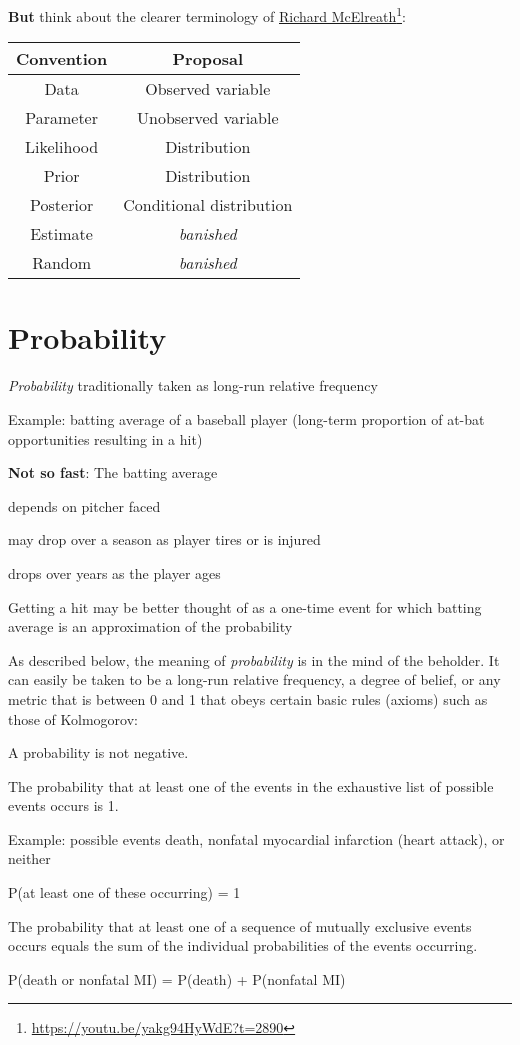 \textbf{But} think about the clearer terminology of
\href{https://youtu.be/yakg94HyWdE?t=2890}{Richard McElreath}\footnote{\url{https://youtu.be/yakg94HyWdE?t=2890}}:

\begin{center}
  \begin{tabular}{cc}
    Convention & Proposal \\ \hline
    Data & Observed variable \\
    Parameter & Unobserved variable \\
    Likelihood & Distribution \\
    Prior & Distribution \\
    Posterior & Conditional distribution \\
    Estimate & \emph{banished} \\
    Random & \emph{banished}
  \end{tabular}
  \end{center}

\section{Probability}\label{sec:prob}
%
%
%

\bi
\item \emph{Probability} traditionally taken as long-run relative
  frequency
\item Example: batting average of a baseball player (long-term
  proportion of at-bat opportunities resulting in a hit)
\item \textbf{Not so fast}: The batting average
  \bi
   \item depends on pitcher faced
   \item may drop over a season as player tires or is injured
   \item drops over years as the player ages
   \ei
\item Getting a hit may be better thought of as a one-time event for
  which batting average is an approximation of the probability
\ei
     
As described below, the meaning of \emph{probability} is in the mind
of the beholder.  It can easily be taken to be a long-run relative
frequency, a degree of belief, or any metric that is between 0 and 1
that obeys certain basic rules (axioms) such as those of Kolmogorov:
\be
\item A probability is not negative.
\item The probability that at least one of the events in the exhaustive list of
  possible events occurs is 1.
  \bi
  \item Example: possible events death, nonfatal myocardial infarction
    (heart attack), or neither
  \item P(at least one of these occurring) = 1
  \ei
\item The probability that at least one of a sequence of mutually
  exclusive events occurs equals the sum of the individual
  probabilities of the events occurring.
  \bi
  \item P(death or nonfatal MI) = P(death) + P(nonfatal MI)
  \ei
\ee

